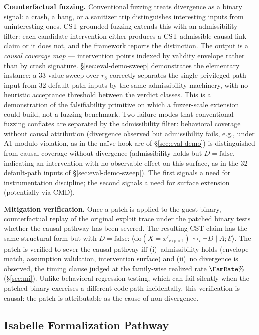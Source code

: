 \documentclass[conference]{IEEEtran}
\begin{document}
\textbf{Counterfactual fuzzing.} Conventional fuzzing treats
divergence as a binary signal: a crash, a hang, or a sanitizer
trip distinguishes interesting inputs from uninteresting ones.
CST-grounded fuzzing extends this with an admissibility filter:
each candidate intervention either produces a CST-admissible
causal-link claim or it does not, and the framework reports the
distinction. The output is a \emph{causal coverage map} ---
intervention points indexed by validity envelope rather than by
crash signature. \S\ref{sec:eval-demo-sweep} demonstrates the
elementary instance: a 33-value sweep over $r_8$ correctly
separates the single privileged-path input from 32 default-path
inputs by the same admissibility machinery, with no heuristic
acceptance threshold between the verdict classes. This is a
demonstration of the falsifiability primitive on which a
fuzzer-scale extension could build, not a fuzzing benchmark.
Two failure modes that conventional fuzzing conflates are
separated by the admissibility filter: behavioral coverage
without causal attribution (divergence observed but admissibility
fails, e.g., under A1-modulo violation, as in the naïve-hook
arc of \S\ref{sec:eval-demo}) is distinguished from causal
coverage without divergence (admissibility holds but
$D = \text{false}$, indicating an intervention with no observable
effect on this surface, as in the 32 default-path inputs of
\S\ref{sec:eval-demo-sweep}). The first signals a need for
instrumentation discipline; the second signals a need for
surface extension (potentially via CMD).

\textbf{Mitigation verification.} Once a patch is applied to the
guest binary, counterfactual replay of the original exploit trace
under the patched binary tests whether the causal pathway has
been severed. The resulting CST claim has the same structural
form but with $D = \text{false}$:
$\langle \text{do}(X{=}x'_\text{exploit}) \rightsquigarrow_i \neg D
\mid A; \mathcal{E}\rangle$. The patch is verified to sever the
causal pathway iff (i)~admissibility holds (envelope match,
assumption validation, intervention surface) and (ii)~no divergence
is observed, the timing clause judged at the family-wise realized
rate $\FamRate\%$ (\S\ref{sec:mi}). Unlike behavioral regression
testing, which can fail
silently when the patched binary exercises a different code path
incidentally, this verification is causal: the patch is
attributable as the cause of non-divergence.

\subsection{Isabelle Formalization Pathway}\label{sec:discussion-isabelle}
\end{document}
